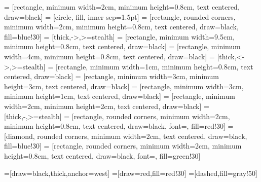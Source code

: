  = [rectangle, minimum width=2cm, minimum height=0.8cm,
text centered, draw=black]
 = [circle, fill, inner sep=1.5pt]
 = [rectangle, rounded corners, minimum width=2cm,
minimum height=0.8cm, text centered, draw=black, fill=blue!30]
 = [thick,->,>=stealth]
 = [rectangle, minimum width=9.5cm, minimum
height=0.8cm, text centered, draw=black]
 = [rectangle, minimum width=4cm, minimum
height=0.8cm, text centered, draw=black]
 = [thick,<->,>=stealth]
 = [rectangle, minimum width=1cm, minimum height=0.8cm,
text centered, draw=black]
 = [rectangle, minimum width=3cm, minimum height=3cm,
                        text centered, draw=black]
 = [rectangle, minimum width=3cm, minimum height=1cm,
                       text centered, draw=black]
 = [rectangle, minimum width=2cm, minimum height=2cm,
                        text centered, draw=black]
 = [thick,-,>=stealth]
 = [rectangle, rounded corners, minimum
width=2cm, minimum height=0.8cm, text centered, draw=black, font=\Large,
fill=red!30]
 = [diamond, rounded corners, minimum width=2cm, text
centered, draw=black, fill=blue!30]
 = [rectangle, rounded corners, minimum
width=2cm, minimum height=0.8cm, text centered, draw=black, font=\Large,
fill=green!30]

=[draw=black,thick,anchor=west]
=[draw=red,fill=red!30]
=[dashed,fill=gray!50]




